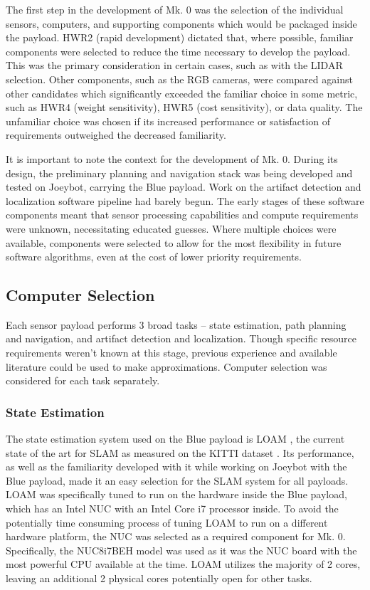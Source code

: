 The first step in the development of Mk. 0 was the selection of the individual sensors, computers, and supporting components which would be packaged inside the payload. HWR2 (rapid development) dictated that, where possible, familiar components were selected to reduce the time necessary to develop the payload. This was the primary consideration in certain cases, such as with the LIDAR selection. Other components, such as the RGB cameras, were compared against other candidates which significantly exceeded the familiar choice in some metric, such as HWR4 (weight sensitivity), HWR5 (cost sensitivity), or data quality. The unfamiliar choice was chosen if its increased performance or satisfaction of requirements outweighed the decreased familiarity.

It is important to note the context for the development of Mk. 0. During its design, the preliminary planning and navigation stack was being developed and tested on Joeybot, carrying the Blue payload. Work on the artifact detection and localization software pipeline had barely begun. The early stages of these software components meant that sensor processing capabilities and compute requirements were unknown, necessitating educated guesses. Where multiple choices were available, components were selected to allow for the most flexibility in future software algorithms, even at the cost of lower priority requirements.

\subsection{Computer Selection}

Each sensor payload performs 3 broad tasks -- state estimation, path planning and navigation, and artifact detection and localization. Though specific resource requirements weren't known at this stage, previous experience and available literature could be used to make approximations. Computer selection was considered for each task separately.

\subsubsection{State Estimation}

The state estimation system used on the Blue payload is LOAM \cite{zhang2014loam}, the current state of the art for SLAM as measured on the KITTI dataset \cite{Geiger2013IJRR}. Its performance, as well as the familiarity developed with it while working on Joeybot with the Blue payload, made it an easy selection for the SLAM system for all payloads. LOAM was specifically tuned to run on the hardware inside the Blue payload, which has an Intel NUC with an Intel Core i7 processor inside. To avoid the potentially time consuming process of tuning LOAM to run on a different hardware platform, the NUC was selected as a required component for Mk. 0. Specifically, the NUC8i7BEH model was used as it was the NUC board with the most powerful CPU available at the time. LOAM utilizes the majority of 2 cores, leaving an additional 2 physical cores potentially open for other tasks.

